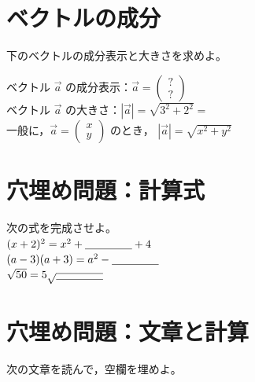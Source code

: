 \documentclass[paper=b4j,landscape,twocolumn,fleqn]{jlreq}
\begin{document}
\section{ベクトルの成分}
下のベクトルの成分表示と大きさを求めよ。\\
\begin{minipage}{0.45\columnwidth}
\end{minipage}
\begin{minipage}{0.45\columnwidth}
ベクトル $\vec{a}$ の成分表示：$\vec{a} = \begin{pmatrix} ? \\ ? \end{pmatrix}$ \\[10pt]
ベクトル $\vec{a}$ の大きさ：$|\vec{a}| = \sqrt{3^2 + 2^2} = $ \\[10pt]
一般に，$\vec{a} = \begin{pmatrix} x \\ y \end{pmatrix}$ のとき，
$|\vec{a}| = \sqrt{x^2 + y^2}$
\end{minipage}

\section{穴埋め問題：計算式}
次の式を完成させよ。\\[5pt]
$(x+2)^2 = x^2 + \underline{\hspace{1.5cm}} + 4$\\[8pt]
$(a-3)(a+3) = a^2 - \underline{\hspace{1.5cm}}$\\[8pt]
$\sqrt{50} = 5\sqrt{\underline{\hspace{1.5cm}}}$

\section{穴埋め問題：文章と計算}
次の文章を読んで，空欄を埋めよ。\\[5pt]
\end{document}
